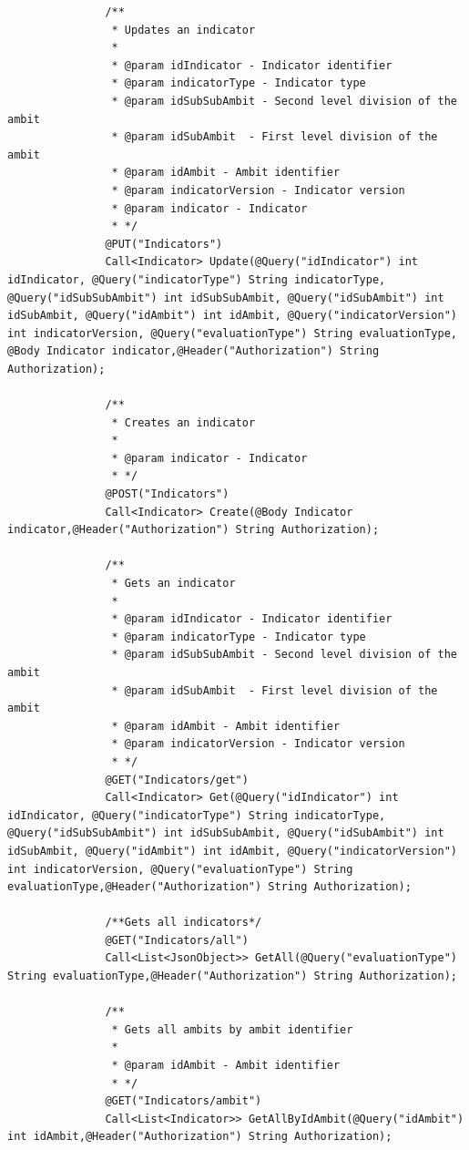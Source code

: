 \begin{itemize}
\begin{itemize}
\begin{lstlisting}
               /**
                * Updates an indicator
                *
                * @param idIndicator - Indicator identifier
                * @param indicatorType - Indicator type
                * @param idSubSubAmbit - Second level division of the ambit
                * @param idSubAmbit  - First level division of the ambit
                * @param idAmbit - Ambit identifier
                * @param indicatorVersion - Indicator version
                * @param indicator - Indicator
                * */
               @PUT("Indicators")
               Call<Indicator> Update(@Query("idIndicator") int idIndicator, @Query("indicatorType") String indicatorType, @Query("idSubSubAmbit") int idSubSubAmbit, @Query("idSubAmbit") int idSubAmbit, @Query("idAmbit") int idAmbit, @Query("indicatorVersion") int indicatorVersion, @Query("evaluationType") String evaluationType, @Body Indicator indicator,@Header("Authorization") String Authorization);
           
               /**
                * Creates an indicator
                *
                * @param indicator - Indicator
                * */
               @POST("Indicators")
               Call<Indicator> Create(@Body Indicator indicator,@Header("Authorization") String Authorization);
           
               /**
                * Gets an indicator
                *
                * @param idIndicator - Indicator identifier
                * @param indicatorType - Indicator type
                * @param idSubSubAmbit - Second level division of the ambit
                * @param idSubAmbit  - First level division of the ambit
                * @param idAmbit - Ambit identifier
                * @param indicatorVersion - Indicator version
                * */
               @GET("Indicators/get")
               Call<Indicator> Get(@Query("idIndicator") int idIndicator, @Query("indicatorType") String indicatorType, @Query("idSubSubAmbit") int idSubSubAmbit, @Query("idSubAmbit") int idSubAmbit, @Query("idAmbit") int idAmbit, @Query("indicatorVersion") int indicatorVersion, @Query("evaluationType") String evaluationType,@Header("Authorization") String Authorization);
           
               /**Gets all indicators*/
               @GET("Indicators/all")
               Call<List<JsonObject>> GetAll(@Query("evaluationType") String evaluationType,@Header("Authorization") String Authorization);
           
               /**
                * Gets all ambits by ambit identifier
                *
                * @param idAmbit - Ambit identifier
                * */
               @GET("Indicators/ambit")
               Call<List<Indicator>> GetAllByIdAmbit(@Query("idAmbit") int idAmbit,@Header("Authorization") String Authorization);
           

\end{lstlisting}
\end{itemize}
\end{itemize}
